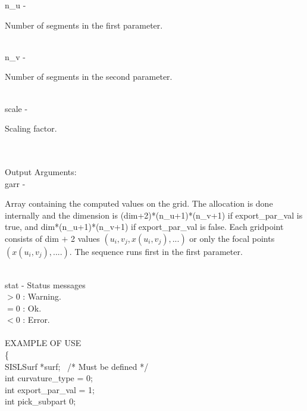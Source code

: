         \>\>    {\fov n\_u}\> - \>  \begin{minipg2}
                     Number of segments in the first parameter.
                               \end{minipg2}\\[0.8ex]
        \>\>    {\fov n\_v}\> - \>  \begin{minipg2}
                     Number of segments in the second parameter.
                               \end{minipg2}\\[0.8ex]
        \>\>    {\fov scale}\> - \>  \begin{minipg2}
                     Scaling factor.
                               \end{minipg2}\\
\\
	\>Output Arguments:\\
        \>\>    {\fov garr}\> - \>  \begin{minipg2}
                     Array containing the computed values on the grid.
		     The allocation is done internally and the dimension 
		     is  (dim+2)*(n\_u+1)*(n\_v+1) if export\_par\_val is 
                     true, and dim*(n\_u+1)*(n\_v+1) if export\_par\_val is
                     false.
                     Each gridpoint consists of dim $+$ 2 values
                     $(u_i,v_j,x(u_i,v_j),...)$ or only the
                     focal points $(x(u_i,v_j),....)$.
		     The sequence runs first in the first parameter.
                              \end{minipg2}\\[0.8ex]
        \>\>    {\fov stat}     \> - \> Status messages\\
                \>\>\>\>   $> 0$  \> : Warning.\\
                \>\>\>\>   $= 0$  \> : Ok.\\
                \>\>\>\>   $< 0$  \> : Error.\\
\\
EXAMPLE OF USE\\
		\>      \{ \\
                \>\>    SISLSurf \> *{\fov surf}; \, /* Must be defined */\\
                \>\>    int \> {\fov curvature\_type} = 0;\\
                \>\>    int \> {\fov export\_par\_val} = 1;\\
                \>\>    int \> {\fov pick\_subpart} 0;\\
